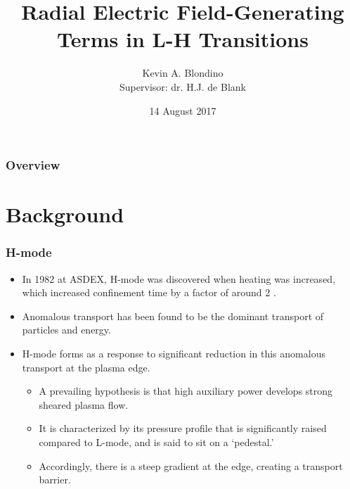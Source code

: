 \documentclass{beamer}
\title[$E_r$-Generating Terms in L-H Transitions]{Radial Electric Field-Generating Terms in L-H Transitions}
\author{Kevin A. Blondino \\
	Supervisor: dr. H.J. de Blank}
\institute[TUe]{Eindhoven University of Technology \\
	\medskip
	\textit{k.blondino@student.tue.nl}}
\date{14 August 2017}
\begin{document}
\begin{frame}
\titlepage
\end{frame}

\begin{frame}
\frametitle{Overview}
\tableofcontents
\end{frame}


\section{Background}
\begin{frame}
\frametitle{H-mode}
\begin{itemize}
	\item In 1982 at ASDEX, H-mode was discovered when heating was increased, which increased confinement time by a factor of around 2 \cite{wagner_development_1984}.
	\item Anomalous transport has been found to be the dominant transport of particles and energy.
	\item H-mode forms as a response to significant reduction in this anomalous transport at the plasma edge.
	\begin{itemize}
		\item A prevailing hypothesis is that high auxiliary power develops strong sheared plasma flow.
		\item It is characterized by its pressure profile that is significantly raised compared to L-mode, and is said to sit on a `pedestal.'
		\item Accordingly, there is a steep gradient at the edge, creating a transport barrier.
	\end{itemize}
\end{itemize}
\end{frame}
\end{document}
